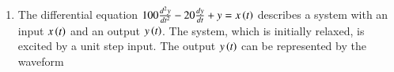 \documentclass[a4paper, 11pt]{article}
\begin{document}
\begin{enumerate}
    \begin{enumerate}
    \end{enumerate}

    \hfill{}

    \item The differential equation $100\frac{d^{2}y}{dt^{2}}-20\frac{dy}{dt}+y=x\left(t\right)$ describes a system with an input $x\left(t\right)$ and an output $y\left(t\right)$. The system, which is initially relaxed, is excited by a unit step input. The output $y\left(t\right)$ can be represented by the waveform
    

\end{enumerate}
\end{document}
